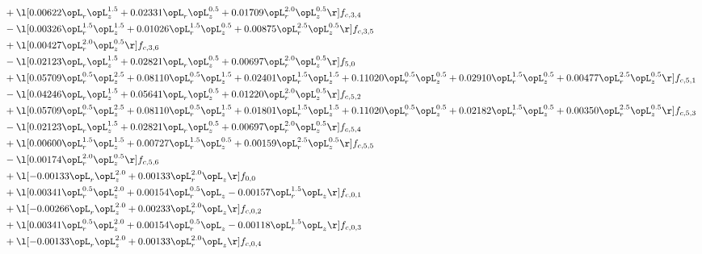 \begin{alignat}{2}
& + \l[  0.00622 \opL_r \opL_z^{1.5} +  0.02331 \opL_r \opL_z^{0.5} +  0.01709 \opL_r^{2.0} \opL_z^{0.5}  \r] f_{c,3,4} \nonumber \\ 
& - \l[  0.00326 \opL_r^{1.5} \opL_z^{1.5} +  0.01026 \opL_r^{1.5} \opL_z^{0.5} +  0.00875 \opL_r^{2.5} \opL_z^{0.5}  \r] f_{c,3,5} \nonumber \\ 
& + \l[  0.00427 \opL_r^{2.0} \opL_z^{0.5}  \r] f_{c,3,6} \nonumber \\ 
& - \l[  0.02123 \opL_r \opL_z^{1.5} +  0.02821 \opL_r \opL_z^{0.5} +  0.00697 \opL_r^{2.0} \opL_z^{0.5}  \r] f_{5,0} \nonumber \\ 
& + \l[  0.05709 \opL_r^{0.5} \opL_z^{2.5} +  0.08110 \opL_r^{0.5} \opL_z^{1.5} +  0.02401 \opL_r^{1.5} \opL_z^{1.5} +  0.11020 \opL_r^{0.5} \opL_z^{0.5} +  0.02910 \opL_r^{1.5} \opL_z^{0.5} +  0.00477 \opL_r^{2.5} \opL_z^{0.5}  \r] f_{c,5,1} \nonumber \\ 
& - \l[  0.04246 \opL_r \opL_z^{1.5} +  0.05641 \opL_r \opL_z^{0.5} +  0.01220 \opL_r^{2.0} \opL_z^{0.5}  \r] f_{c,5,2} \nonumber \\ 
& + \l[  0.05709 \opL_r^{0.5} \opL_z^{2.5} +  0.08110 \opL_r^{0.5} \opL_z^{1.5} +  0.01801 \opL_r^{1.5} \opL_z^{1.5} +  0.11020 \opL_r^{0.5} \opL_z^{0.5} +  0.02182 \opL_r^{1.5} \opL_z^{0.5} +  0.00350 \opL_r^{2.5} \opL_z^{0.5}  \r] f_{c,5,3} \nonumber \\ 
& - \l[  0.02123 \opL_r \opL_z^{1.5} +  0.02821 \opL_r \opL_z^{0.5} +  0.00697 \opL_r^{2.0} \opL_z^{0.5}  \r] f_{c,5,4} \nonumber \\ 
& + \l[  0.00600 \opL_r^{1.5} \opL_z^{1.5} +  0.00727 \opL_r^{1.5} \opL_z^{0.5} +  0.00159 \opL_r^{2.5} \opL_z^{0.5}  \r] f_{c,5,5} \nonumber \\ 
& - \l[  0.00174 \opL_r^{2.0} \opL_z^{0.5}  \r] f_{c,5,6} \nonumber \\ 
& + \l[  -0.00133 \opL_r \opL_z^{2.0} +  0.00133 \opL_r^{2.0} \opL_z  \r] f_{0,0} \nonumber \\ 
& + \l[  0.00341 \opL_r^{0.5} \opL_z^{2.0} +  0.00154 \opL_r^{0.5} \opL_z   -0.00157 \opL_r^{1.5} \opL_z  \r] f_{c,0,1} \nonumber \\ 
& + \l[  -0.00266 \opL_r \opL_z^{2.0} +  0.00233 \opL_r^{2.0} \opL_z  \r] f_{c,0,2} \nonumber \\ 
& + \l[  0.00341 \opL_r^{0.5} \opL_z^{2.0} +  0.00154 \opL_r^{0.5} \opL_z   -0.00118 \opL_r^{1.5} \opL_z  \r] f_{c,0,3} \nonumber \\ 
& + \l[  -0.00133 \opL_r \opL_z^{2.0} +  0.00133 \opL_r^{2.0} \opL_z  \r] f_{c,0,4} \nonumber \\ 

\end{alignat}
